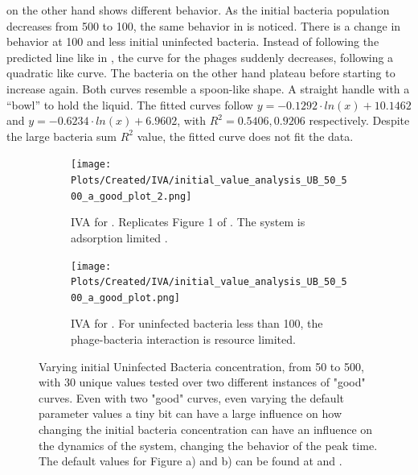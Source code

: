  on the other hand shows different behavior. 
As the initial bacteria population decreases from 500 to 100, the same behavior in  is noticed.
There is a change in behavior at 100 and less initial uninfected bacteria. 
Instead of following the predicted line like in , the curve for the phages suddenly decreases, following a quadratic like curve. 
The bacteria on the other hand plateau before starting to increase again. 
Both curves resemble a spoon-like shape. A straight handle with a “bowl” to hold the liquid. 
The fitted curves follow $y = -0.1292\cdot ln(x) + 10.1462$ and $y = -0.6234\cdot ln(x)+6.9602$, with $R^2=0.5406, 0.9206$ respectively. 
Despite the large bacteria sum $R^2$ value, the fitted curve does not fit the data. 

\begin{figure}
    \centering
    \begin{subfigure}{1\linewidth}
        \centering
        \texttt{[image: Plots/Created/IVA/initial\_value\_analysis\_UB\_50\_500\_a\_good\_plot\_2.png]}
        \caption{
            IVA for . 
            Replicates Figure 1 of \citet{mullaExtremeDiversityPhage2024}. 
            The system is adsorption limited \cite{mullaExtremeDiversityPhage2024}. 
        }
        \label{fig:created:initial_value_analysis_UB_50_500_a_good_plot_2}
    \end{subfigure}
    \hfill
    \begin{subfigure}{1\linewidth}
        \centering
        \texttt{[image: Plots/Created/IVA/initial\_value\_analysis\_UB\_50\_500\_a\_good\_plot.png]}
        \caption{
            IVA for . 
            For uninfected bacteria less than 100, the phage-bacteria interaction is resource limited. 
        }
        \label{fig:created:initial_value_analysis_UB_50_500_a_good_plot}
    \end{subfigure}
    \caption{
        Varying initial Uninfected Bacteria concentration, from 50 to 500, with 30 unique values tested over two different instances of "good" curves. 
        Even with two "good" curves, even varying the default parameter values a tiny bit can have a large influence on how changing the initial bacteria concentration can have an influence on the dynamics of the system, changing the behavior of the peak time. 
        The default values for Figure a) and b) can be found at  and . 
    }
\end{figure}

